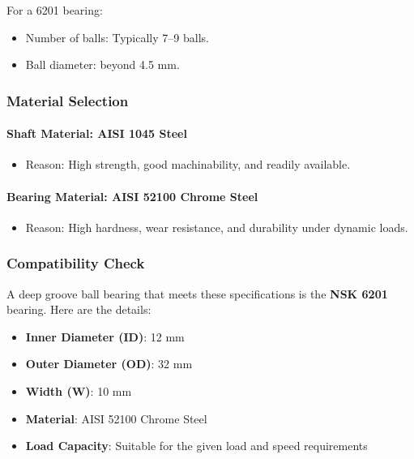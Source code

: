 \documentclass[../../main]{subfiles}
\begin{document}
For a 6201 bearing:

\begin{itemize}
\item
  Number of balls: Typically 7--9 balls.
\item
  Ball diameter: beyond 4.5 mm.
\end{itemize}

\subsubsection{Material Selection}
\paragraph{Shaft Material: AISI 1045 Steel}

\begin{itemize}
\item
  Reason: High strength, good machinability, and readily available.
\end{itemize}

\paragraph{Bearing Material: AISI 52100 Chrome Steel}

\begin{itemize}
\item
  Reason: High hardness, wear resistance, and durability under dynamic
  loads.
\end{itemize}

\subsubsection{Compatibility Check}

A deep groove ball bearing that meets these specifications is the
\textbf{NSK 6201} bearing. Here are the details:

\begin{itemize}
\item
  \textbf{Inner Diameter (ID)}: 12 mm
\item
  \textbf{Outer Diameter (OD)}: 32 mm
\item
  \textbf{Width (W)}: 10 mm
\item
  \textbf{Material}: AISI 52100 Chrome Steel
\item
  \textbf{Load Capacity}: Suitable for the given load and speed
  requirements
\end{itemize}
\end{document}
